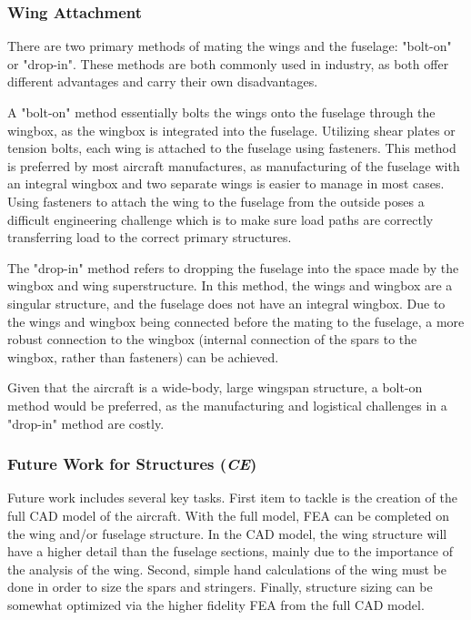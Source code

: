 \subsubsection{Wing Attachment}
There are two primary methods of mating the wings and the fuselage: "bolt-on" or "drop-in". These methods are both commonly used in industry, as both offer different advantages and carry their own disadvantages. 

A "bolt-on" method essentially bolts the wings onto the fuselage through the wingbox, as the wingbox is integrated into the fuselage. Utilizing shear plates or tension bolts, each wing is attached to the fuselage using fasteners. This method is preferred by most aircraft manufactures, as manufacturing of the fuselage with an integral wingbox and two separate wings is easier to manage in most cases. Using fasteners to attach the wing to the fuselage from the outside poses a difficult engineering challenge which is to make sure load paths are correctly transferring load to the correct primary structures.

The "drop-in" method refers to dropping the fuselage into the space made by the wingbox and wing superstructure. In this method, the wings and wingbox are a singular structure, and the fuselage does not have an integral wingbox. Due to the wings and wingbox being connected before the mating to the fuselage, a more robust connection to the wingbox (internal connection of the spars to the wingbox, rather than fasteners) can be achieved. 

Given that the aircraft is a wide-body, large wingspan structure, a bolt-on method would be preferred, as the manufacturing and logistical challenges in a "drop-in" method are costly.

\subsubsection{Future Work for Structures (\textit{CE})}
Future work includes several key tasks. First item to tackle is the creation of the full CAD model of the aircraft. With the full model, FEA can be completed on the wing and/or fuselage structure. In the CAD model, the wing structure will have a higher detail than the fuselage sections, mainly due to the importance of the analysis of the wing. Second, simple hand calculations of the wing must be done in order to size the spars and stringers. Finally, structure sizing can be somewhat optimized via the higher fidelity FEA from the full CAD model.

